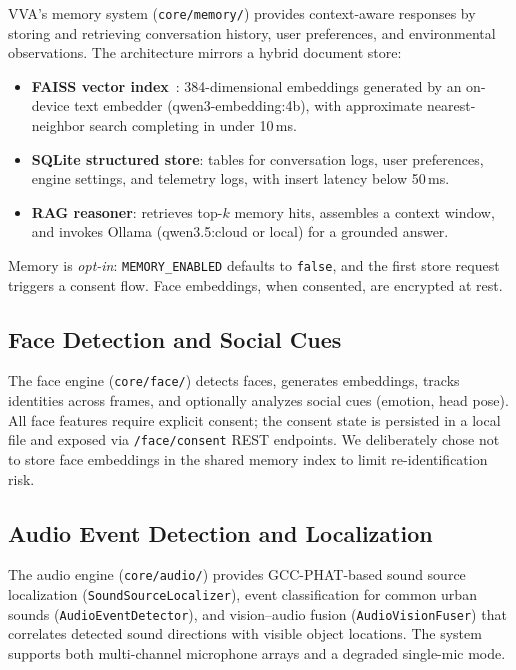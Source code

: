 VVA's memory system (\texttt{core/memory/}) provides context-aware responses by storing and retrieving conversation history, user preferences, and environmental observations. The architecture mirrors a hybrid document store:

\begin{itemize}
    \item \textbf{FAISS vector index}~\cite{faiss2024}: 384-dimensional embeddings generated by an on-device text embedder (qwen3-embedding:4b), with approximate nearest-neighbor search completing in under 10\,ms.
    \item \textbf{SQLite structured store}: tables for conversation logs, user preferences, engine settings, and telemetry logs, with insert latency below 50\,ms.
    \item \textbf{RAG reasoner}: retrieves top-$k$ memory hits, assembles a context window, and invokes Ollama (qwen3.5:cloud or local) for a grounded answer.
\end{itemize}

Memory is \emph{opt-in}: \texttt{MEMORY\_ENABLED} defaults to \texttt{false}, and the first store request triggers a consent flow. Face embeddings, when consented, are encrypted at rest.

\subsection{Face Detection and Social Cues}

The face engine (\texttt{core/face/}) detects faces, generates embeddings, tracks identities across frames, and optionally analyzes social cues (emotion, head pose). All face features require explicit consent; the consent state is persisted in a local file and exposed via \texttt{/face/consent} REST endpoints. We deliberately chose not to store face embeddings in the shared memory index to limit re-identification risk.

\subsection{Audio Event Detection and Localization}

The audio engine (\texttt{core/audio/}) provides GCC-PHAT-based sound source localization (\texttt{SoundSourceLocalizer}), event classification for common urban sounds (\texttt{AudioEventDetector}), and vision--audio fusion (\texttt{AudioVisionFuser}) that correlates detected sound directions with visible object locations. The system supports both multi-channel microphone arrays and a degraded single-mic mode.

